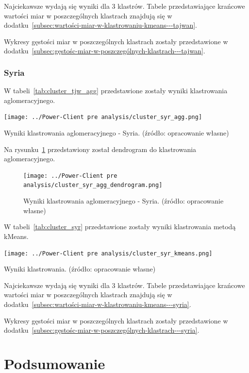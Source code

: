 \documentclass[11pt]{report}
\begin{document}
    Najciekawsze wydają się wyniki dla 3 klastrów.
    Tabele przedstawiające krańcowe wartości miar w poszczególnych klastrach znajdują się w dodatku~\ref{subsec:wartości-miar-w-klastrowaniu-kmeans---tajwan}.

    Wykresy gęstości miar w poszczególnych klastrach zostały przedstawione w dodatku~\ref{subsec:gęstośc-miar-w-poszczególnych-klastrach---tajwan}.

    \subsection{Syria}

    W tabeli~\ref{tab:cluster_tjw_agg} przedstawione zostały wyniki klastrowania aglomeracyjnego.
    \begin{table}[!htp]
        \centering
        \texttt{[image: ../Power-Client pre analysis/cluster\_syr\_agg.png]}
        \caption{Wyniki klastrowania aglomeracyjnego - Syria. (źródło: opracowanie własne)}
        \label{tab:cluster_syr_agg}
    \end{table}
    Na rysunku~\ref{fig:cluster_syr_agg_dendrogram} przedstawiony został dendrogram do klastrowania aglomeracyjnego.
    \begin{figure}[!htp]
        \centering
        \texttt{[image: ../Power-Client pre analysis/cluster\_syr\_agg\_dendrogram.png]}
        \caption{Wyniki klastrowania aglomeracyjnego - Syria. (źródło: opracowanie własne)}
        \label{fig:cluster_syr_agg_dendrogram}
    \end{figure}

    W tabeli~\ref{tab:cluster_syr} przedstawione zostały wyniki klastrowania metodą kMeans.
    \begin{table}[!htp]
        \centering
        \texttt{[image: ../Power-Client pre analysis/cluster\_syr\_kmeans.png]}
        \caption{Wyniki klastrowania. (źródło: opracowanie własne)}
        \label{tab:cluster_syr}
    \end{table}

    Najciekawsze wydają się wyniki dla 3 klastrów.
    Tabele przedstawiające krańcowe wartości miar w poszczególnych klastrach znajdują się w dodatku~\ref{subsec:wartości-miar-w-klastrowaniu-kmeans---syria}.

    Wykresy gęstości miar w poszczególnych klastrach zostały przedstawione w dodatku~\ref{subsec:gęstośc-miar-w-poszczególnych-klastrach---syria}.


    \chapter{Podsumowanie}\label{ch:podsumowanie}
\end{document}
